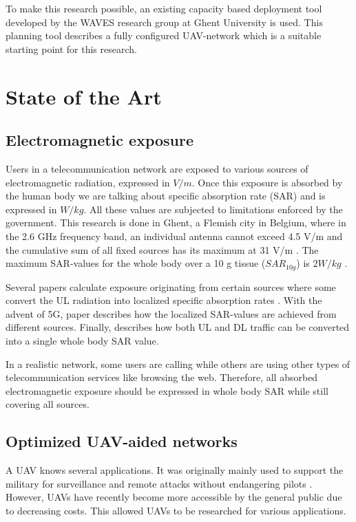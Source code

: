\documentclass[twocolumn]{phdsymp} %
\begin{document}
To make this research possible, 
an existing capacity based deployment tool developed by the WAVES research group at Ghent University is used.
This planning tool describes a fully configured \gls{UAV}-network which is a suitable starting point for this research.


\section{State of the Art}
\subsection{Electromagnetic exposure}

Users in a telecommunication network are exposed to various sources of electromagnetic radiation, expressed in $V/m$. Once this exposure is absorbed by the human 
body we are talking about specific absorption rate (SAR) and is expressed in $W/kg$. All these values are 
subjected to limitations enforced by the government. This research is done in Ghent, 
a Flemish city in Belgium, where in the 2.6 GHz frequency band, an individual antenna cannot exceed 4.5 V/m and the cumulative sum of all 
fixed sources has its maximum at 31 V/m \cite{J23, S13_normenBelgie}. The maximum SAR-values for the whole body 
over a 10 g tissue ($SAR_{10g}$) is $2 W/kg$ \cite{J30}. 

Several papers calculate exposure originating from certain sources  \cite{J6_originalExposureFormula, J1, J10_RDP, J10.1} 
where some convert the \gls{UL} radiation into localized specific absorption rates \cite{ J10_RDP, J10.1}. 
With the advent of 5G, paper \cite{J17_kuehn2019modelling} describes 
how the localized \gls{SAR}-values are achieved from different sources.
Finally, \cite{J22_plets2015joint} describes how both \gls{UL} and \gls{DL} traffic can be converted into a single whole body SAR value.

In a realistic network, some users are calling while others are using other types of telecommunication services like browsing the web.
Therefore, all absorbed electromagnetic exposure should be expressed in whole body SAR while still covering all sources.

\subsection{Optimized \gls{UAV}-aided networks}

A \gls{UAV} knows several applications. It was originally mainly used to support the military for surveillance and remote attacks without 
endangering pilots \cite{U12}. However, \gls{UAV}s have recently become more accessible by the general public due to decreasing costs. This 
allowed \gls{UAV}s to be researched for various applications.
\end{document}
